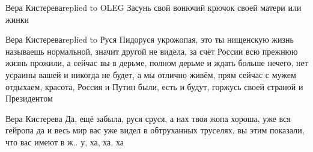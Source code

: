  
 
 
 
 



Вера Кистереваreplied to OLEG
Засунь свой вонючий крючок своей матери или жинки

Вера Кистереваreplied to Руся
Пидоруся укрожопая, это ты нищенскую жизнь называешь нормальной, значит другой не видела, за счёт России всю прежнюю жизнь прожили, а сейчас вы в дерьме, полном дерьме и ждать больше нечего, нет усраины вашей и никогда не будет, а мы отлично живём, прям сейчас с мужем отдыхаем, красота, Россия и Путин были, есть и будут, горжусь своей страной и Президентом

Вера Кистерева
Да, ещё забыла, руся сруся, а нах твоя жопа хороша, уже вся гейропа да и весь мир вас уже видел в обтруханных труселях, вы этим показали, что вас имеют в ж.. у, ха, ха, ха

